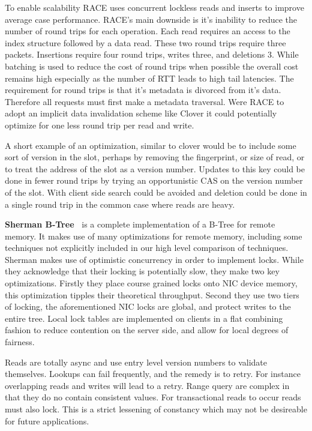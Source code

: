 To enable scalability RACE uses concurrent lockless reads and inserts to improve
average case performance.  RACE's main downside is it's inability to reduce the
number of round trips for each operation. Each read requires an access to the
index structure followed by a data read. These two round trips require three
packets. Insertions require four round trips, writes three, and deletions 3.
While batching is used to reduce the cost of round trips when possible the
overall cost remains high especially as the number of RTT leads to high tail
latencies. The requirement for round trips is that it's metadata is divorced
from it's data. Therefore all requests must first make a metadata traversal.
Were RACE to adopt an implicit data invalidation scheme like Clover it could
potentially optimize for one less round trip per read and write.

A short example of an optimization, similar to clover would be to include some
sort of version in the slot, perhaps by removing the fingerprint, or size of
read, or to treat the address of the slot as a version number. Updates to this
key could be done in fewer round trips by trying an opportunistic CAS on the
version number of the slot. With client side search could be avoided and
deletion could be done in a single round trip in the common case where reads are
heavy.



\textbf{Sherman B-Tree~\cite{sherman}}
is a complete implementation of a B-Tree for remote memory.
It makes use of many optimizations for remote memory, including some techniques
not explicitly included in our high level comparison of techniques. Sherman
makes use of optimistic concurrency in order to implement locks. While they
acknowledge that their locking is potentially slow, they make two key
optimizations. Firstly they place course grained locks onto NIC device memory,
this optimization tipples their theoretical throughput. Second they use two
tiers of locking, the aforementioned NIC locks are global, and protect writes to the
entire tree. Local lock tables are implemented on clients in a flat combining
fashion to reduce contention on the server side, and allow for local degrees of
fairness.

Reads are totally async and use entry level version numbers to validate
themselves. Lookups can fail frequently, and the remedy is to retry. For
instance overlapping reads and writes will lead to a retry. Range query are
complex in that they do no contain consistent values. For transactional reads to
occur reads must also lock. This is a strict lessening of constancy which may
not be desireable for future applications.

